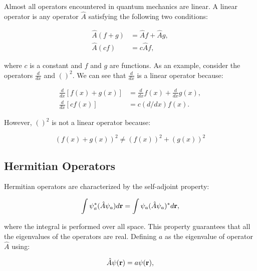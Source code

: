 \documentclass[
  9pt,
]{extbook}
\theoremstyle{definition}
\theoremstyle{definition}
\theoremstyle{definition}
\theoremstyle{remark}
\begin{document}
Almost all operators encountered in quantum mechanics are linear. A linear operator is any operator \(\hat{A}\) satisfying the following two conditions:

\begin{equation}
\begin{aligned}
\hat{A} (f + g)  &= \hat{A} f + \hat{A} g, \\
\hat{A} (c f) &= c \hat{A} f,
\end{aligned}
\label{eq:linop1}
\end{equation}

where \(c\) is a constant and \(f\) and \(g\) are functions. As an example, consider the operators \(\frac{d}{dx}\) and \(()^2\). We can see that \(\frac{d}{dx}\) is a linear operator because:

\begin{equation}
\begin{aligned}
\frac{d}{dx}[f(x) + g(x)] &=\frac{d}{dx}f(x) + \frac{d}{dx}g(x), \\
\frac{d}{dx}[c f(x)] &= c (d/dx) f(x).
\end{aligned}
\label{eq:linop2}
\end{equation}

However, \(()^2\) is not a linear operator because:

\begin{equation}
(f(x) + g(x))^2 \neq (f(x))^2 + (g(x))^2
\label{eq:linop3}
\end{equation}

\hypertarget{hermitian-operators}{%
\subsection{Hermitian Operators}\label{hermitian-operators}}

Hermitian operators are characterized by the self-adjoint property:

\begin{equation}
\int \psi_a^{*} (\hat{A} \psi_a)d{\bf r} =  \int \psi_a (\hat{A} \psi_a)^{*}d{\bf r},
\label{eq:hop1}
\end{equation}

where the integral is performed over all space. This property guarantees that all the eigenvalues of the operators are real. Defining \(a\) as the eigenvalue of operator \(\hat{A}\) using:

\begin{equation}
\hat{A} \psi({\bf r}) = a \psi({\bf r}),
\label{eq:hop2}
\end{equation}
\end{document}
